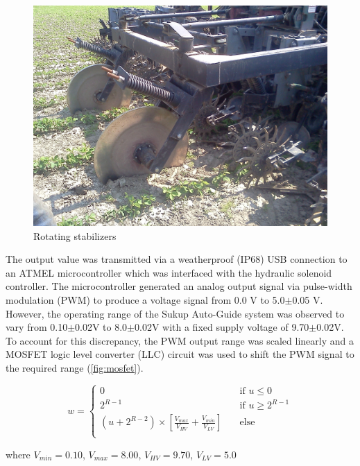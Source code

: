 \documentclass[authoryear]{elsarticle}
\begin{document}
\begin{figure}
  \centering
  \includegraphics[scale=0.1,natwidth=610,natheight=642]{stabilizers.jpg}
  \caption{Rotating stabilizers}
  \label{fig:stabilizers}
\end{figure}

The output value was transmitted via a weatherproof (IP68) USB
connection to an ATMEL microcontroller which was interfaced with the
hydraulic solenoid controller. The microcontroller generated an analog
output signal via pulse-width modulation (PWM) to produce a voltage
signal from 0.0 V to 5.0$\pm$0.05 V. However, the operating range of
the Sukup Auto-Guide system was observed to vary from 0.10$\pm$0.02V
to 8.0$\pm$0.02V with a fixed supply voltage of 9.70$\pm$0.02V. To
account for this discrepancy, the PWM output range was scaled linearly
and a MOSFET logic level converter (LLC) circuit was used to
shift the PWM signal to the required range (\ref{fig:mosfet}).

\begin{equation}
  w = 
  \begin{cases}
    0 & \quad \text{if } u \leq 0 \\
    2^{R-1} & \quad \text{if } u \geq 2^{R-1}\\
    (u +2^{R-2})\times\left[\frac{V_{max}}{V_{HV}}+\frac{V_{min}}{V_{LV}}\right] & \quad \text{else} \\
  \end{cases}
  \label{eq:v_out}
\end{equation}
\begin{flushleft}
where $V_{min}=0.10$, $V_{max}=8.00$, $V_{HV}=9.70$, $V_{LV}=5.0$
\end{flushleft}
\end{document}
